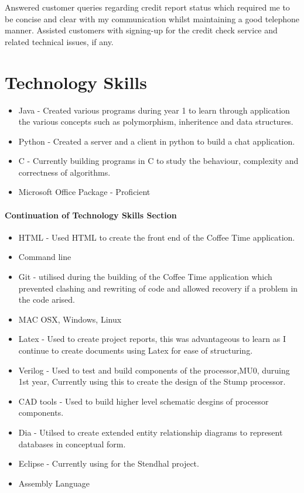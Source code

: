 \documentclass{my_cv}
\begin{document}

\workitemTwo
{Answered customer queries regarding credit report status which required me to be concise and clear with my communication whilst maintaining a good telephone manner.
}
{Assisted customers with signing-up for the credit check service and related technical issues, if any. 
}





\section{Technology Skills}
\begin{itemize}
  \item Java - Created various programs during year 1 to learn through application the various concepts such as polymorphism, inheritence and data structures. 
  \item Python -  Created a server and a client in python to build a chat application. 
  \item C - Currently building programs in C to study the behaviour, complexity and correctness of algorithms.
  \item Microsoft Office Package - Proficient
   \end{itemize}
  \paragraph{Continuation of Technology Skills Section} 
  \begin{itemize}
  \item HTML - Used HTML to create the front end of the Coffee Time application.
  \item Command line
  \item Git - utilised during the building of the Coffee Time application which prevented clashing and rewriting of code and allowed recovery if a problem in the code arised. 
  \item MAC OSX, Windows, Linux
  \item Latex - Used to create project reports, this was advantageous to learn as I continue to create documents    using Latex for ease of structuring. 
  \item Verilog - Used to test and build components of the processor,MU0, duruing 1st year, Currently using this to create the design of the Stump processor.
  \item CAD tools - Used to build higher level schematic desgins of processor components. 
  \item Dia - Utilsed to create extended entity relationship diagrams to represent databases in conceptual form.
  \item Eclipse - Currently using for the Stendhal project. 
  \item Assembly Language
\end{itemize}
\end{document}
